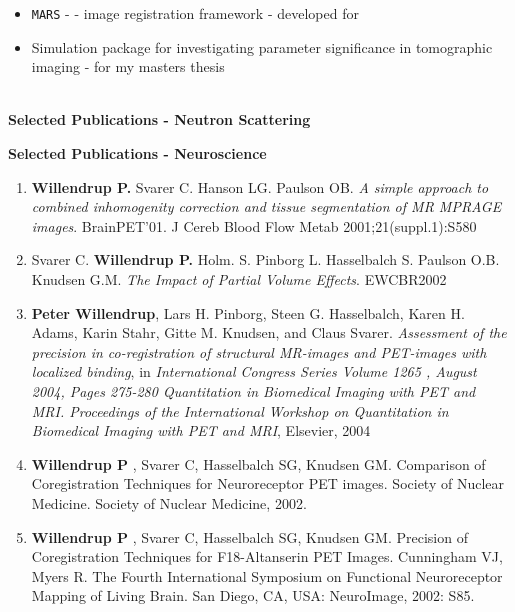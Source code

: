 \documentclass[a4paper,12pt]{article}
\begin{document}
\begin{itemize}
{    used for visualisation. Also used for front cover illustrations in
    \emph{Neuroimage}
    (), 
    (),
    ().}
\item{\texttt{MARS} -  -
      image registration framework -
    developed for }
\item{Simulation package for investigating parameter significance in
    tomographic imaging - for my masters thesis}
\end{itemize}\ \\
{\bf\large Selected Publications - Neutron Scattering}\\
  {\small
      
  }
{\bf\large Selected Publications - Neuroscience}\\
  {\small  
  \begin{enumerate}
  \item{{\bf Willendrup P.} Svarer C. Hanson LG. Paulson OB. \emph{A simple
      approach to combined inhomogenity correction and tissue
      segmentation of MR MPRAGE images}. BrainPET'01. J Cereb Blood
    Flow Metab 2001;21(suppl.1):S580}
\item{Svarer C. {\bf Willendrup P.} Holm. S. Pinborg L. Hasselbalch
    S. Paulson O.B. Knudsen G.M. \emph{The Impact of Partial Volume
      Effects}. EWCBR2002} 
\item{{\bf Peter Willendrup}, Lars H. Pinborg, Steen G. Hasselbalch, Karen
      H. Adams, Karin Stahr, Gitte M. Knudsen, and Claus
      Svarer. \emph{Assessment of the precision in co-registration of
      structural MR-images and PET-images with localized binding}, in \emph{ 	International Congress Series
Volume 1265 , August 2004, Pages 275-280
Quantitation in Biomedical Imaging with PET and MRI. Proceedings of the International Workshop on Quantitation in Biomedical Imaging with PET and MRI}, Elsevier, 2004}
\item{{\bf Willendrup P} , Svarer C, Hasselbalch SG, Knudsen GM. Comparison of Coregistration Techniques for Neuroreceptor PET images. Society of Nuclear Medicine. Society of Nuclear Medicine, 2002.}
\item{{\bf Willendrup P} , Svarer C, Hasselbalch SG, Knudsen GM. Precision of Coregistration Techniques for F18-Altanserin PET Images. Cunningham VJ, Myers R. The Fourth International Symposium on Functional Neuroreceptor Mapping of Living Brain. San Diego, CA, USA: NeuroImage, 2002: S85.}
\end{enumerate}
}
\end{document}
